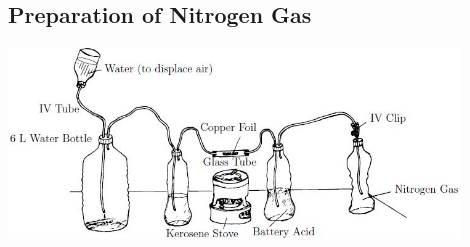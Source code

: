 \subsection{Preparation of Nitrogen Gas} %

\begin{center}
\includegraphics[width=0.9\textwidth]{./img/nitrogen-gas.png}
\end{center}

